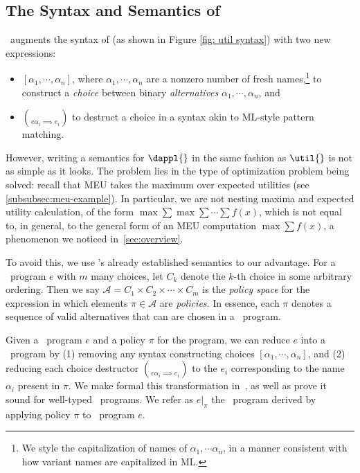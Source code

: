 \subsection{The Syntax and Semantics of \dappl}\label{subsec:dappl}

\dappl~augments the syntax of \util{}
(as shown in Figure \ref{fig: util syntax}) with two new expressions:
\begin{itemize}
  \item $[\alpha_1, \cdots, \alpha_n]$,
  where $\alpha_1,\cdots, \alpha_n$ are a nonzero number of fresh names,\footnote{
  We style
  the capitalization of names of $\alpha_1, \cdots \alpha_n$,
  in a manner consistent with how variant names are capitalized in ML.}
  to construct a \textit{choice} between
  binary \textit{alternatives} $\alpha_1, \cdots, \alpha_n$, and
  \item $\choose e {\alpha_i \implies e_i}$ to destruct a choice
  in a syntax akin to ML-style pattern matching.
\end{itemize}

However, writing a semantics for $\dappl{}$ in the same fashion as $\util{}$
is not as simple as it looks.
The problem lies in the type of optimization problem being solved:
recall that MEU takes the maximum over expected utilities
(see \cref{subsubsec:meu-example}).
In particular, we are not nesting maxima and expected utility calculation,
of the form $\max\sum\max\sum \cdots \sum f(x)$, which is not equal to,
in general, to the general form of an MEU computation $\max \sum f(x)$,
a phenomenon we noticed in~\cref{sec:overview}.

To avoid this,
we use \util's already established semantics to our advantage.
For a \dappl~program $e$ with $m$ many choices,
let $C_k$ denote the $k$-th choice in some arbitrary ordering.
Then we say $\mathcal A = C_1 \times C_2 \times \cdots \times C_m$
is the \textit{policy space} for the expression
in which elements $\pi \in \mathcal A$ are \textit{policies}.
In essence, each $\pi$ denotes a sequence of
valid alternatives that can are chosen in a \dappl~program.

Given a \dappl~program $e$ and a policy $\pi$ for the program,
we can reduce $e$ into a \util~program
by (1) removing any syntax constructing choices $[\alpha_1, \cdots, \alpha_n]$, and
(2) reducing each choice destructor $\choose e {\alpha_i \implies e_i}$ to the $e_i$
corresponding to the name $\alpha_i$ present in $\pi$.
We make formal this transformation in~\citet{cho2025scaling},
as well as prove it sound for well-typed \dappl~programs.
We refer as $e|_{\pi}$ the \util~program derived by applying policy $\pi$ to \dappl~program $e$.

